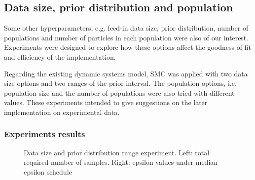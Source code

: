 \subsection{Data size, prior distribution and population}


Some other hyperparameters, e.g. feed-in data size, prior distribution, number of populations and number of particles in each population were also of our interest. Experiments were designed to explore how these options affect the goodness of fit and efficiency of the implementation.

Regarding the existing dynamic systems model, SMC was applied with two data size options and two ranges of the prior interval. The population options, i.e. population size and the number of populations were also tried with different values. These experiments intended to give suggestions on the later implementation on experimental data.

\subsubsection{Experiments results}

\begin{figure}[H]
    \begin{center}
    \end{center}

    \caption[Data size and prior distribution range experiment]%
    {Data size and prior distribution range experiment. Left: total required number of samples. Right: epsilon values under median epsilon schedule}
    \label{fig:size}

\end{figure}


